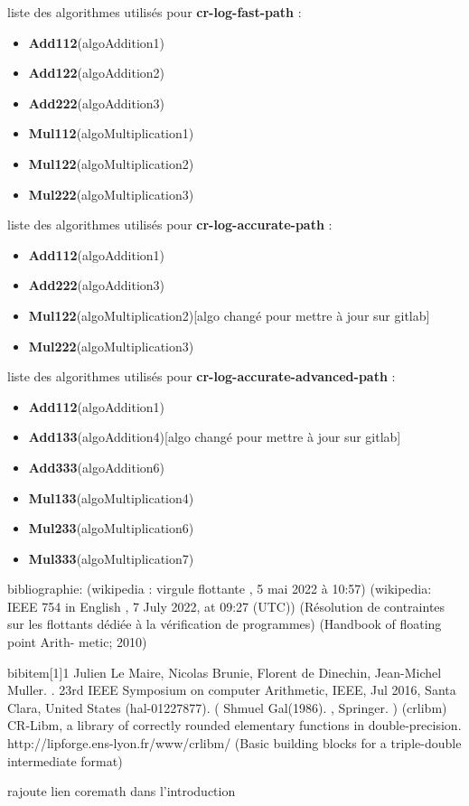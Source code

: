 liste des algorithmes utilisés pour \textbf{cr-log-fast-path} :
\begin{itemize}
\item \textbf{Add112}(algoAddition1)
\item \textbf{Add122}(algoAddition2)
\item \textbf{Add222}(algoAddition3)
\item \textbf{Mul112}(algoMultiplication1)
\item \textbf{Mul122}(algoMultiplication2)
\item \textbf{Mul222}(algoMultiplication3)
\end{itemize}

liste des algorithmes utilisés pour \textbf{cr-log-accurate-path} :
\begin{itemize}
\item \textbf{Add112}(algoAddition1)
\item \textbf{Add222}(algoAddition3)
\item \textbf{Mul122}(algoMultiplication2)[algo changé pour mettre à jour sur gitlab]
\item \textbf{Mul222}(algoMultiplication3)
\end{itemize}

liste des algorithmes utilisés pour \textbf{cr-log-accurate-advanced-path} :
\begin{itemize}
\item \textbf{Add112}(algoAddition1)
\item \textbf{Add133}(algoAddition4)[algo changé pour mettre à jour sur gitlab]
\item \textbf{Add333}(algoAddition6)
\item \textbf{Mul133}(algoMultiplication4)
\item \textbf{Mul233}(algoMultiplication6)
\item \textbf{Mul333}(algoMultiplication7)
\end{itemize}

bibliographie:
(wikipedia : virgule flottante , 5 mai 2022 à 10:57)
(wikipedia: IEEE 754 in English , 7 July 2022, at 09:27 (UTC))
(Résolution de contraintes sur les flottants
dédiée à la vérification de programmes)
(Handbook of floating point Arith-
metic; 2010)

bibitem[1]{1} Julien Le Maire, Nicolas Brunie, Florent de Dinechin, Jean-Michel Muller. . 23rd IEEE Symposium on computer Arithmetic, IEEE, Jul 2016, Santa Clara, United States (hal-01227877).
( Shmuel Gal(1986). , Springer. )
(crlibm)
CR-Libm, a library of correctly rounded elementary functions in double-precision. http://lipforge.ens-lyon.fr/www/crlibm/
(Basic
building blocks for a triple-double intermediate format)

rajoute lien coremath dans l'introduction